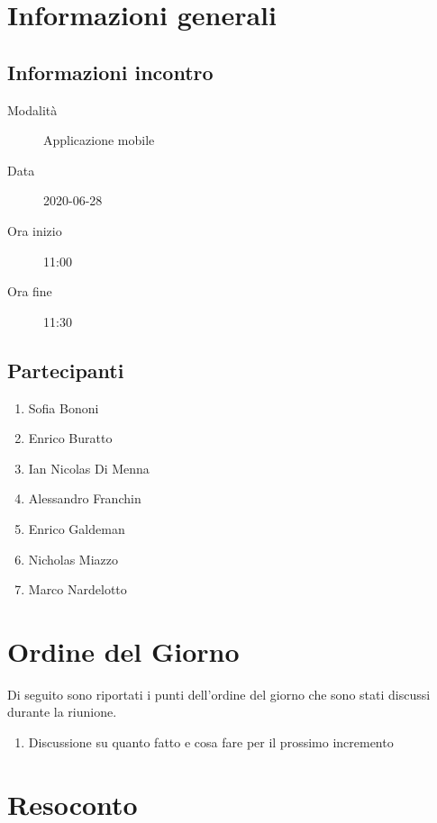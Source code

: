 \documentclass{article}
\begin{document}


\section{Informazioni generali}%
\label{sec:informazioni_generali}

\subsection{Informazioni incontro}%
\label{sub:informazioni_incontro}

\begin{description}
  \item[Modalità] Applicazione mobile 
  \item[Data] 2020-06-28
  \item[Ora inizio] 11:00
  \item[Ora fine] 11:30
\end{description}

\subsection{Partecipanti}%
\label{sub:partecipanti}

\begin{enumerate}
  \item Sofia Bononi
  \item Enrico Buratto
  \item Ian Nicolas Di Menna
  \item Alessandro Franchin
  \item Enrico Galdeman
  \item Nicholas Miazzo
  \item Marco Nardelotto
\end{enumerate}

\section{Ordine del Giorno}%
\label{ordine_del_giorno}
Di seguito sono riportati i punti dell'ordine del giorno che sono stati discussi durante la riunione.
\begin{enumerate}
  \item Discussione su quanto fatto e cosa fare per il prossimo incremento
\end{enumerate}

\section{Resoconto}%
\label{resoconto}
\end{document}
